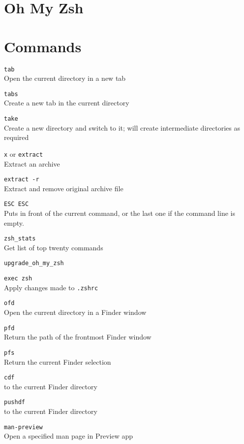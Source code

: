 \documentclass[a4paper,landscape,columns=3]{cheatsheet}
\begin{document}
\sffamily

\section{Oh My Zsh}

\bigskip

\section{Commands}

\texttt{tab}\\
Open the current directory in a new tab

\texttt{tabs}\\
Create a new tab in the current directory

\texttt{take}\\
Create a new directory and switch to it; will create intermediate directories as required

\texttt{x} or \texttt{extract}\\
Extract an archive

\texttt{extract -r}\\
Extract and remove original archive file

\texttt{ESC ESC}\\
Puts {} in front of the current command, or the last one if the command line is empty.

\texttt{zsh\_stats}\\
Get list of top twenty commands

\texttt{upgrade\_oh\_my\_zsh}

\texttt{exec zsh}\\
Apply changes made to \texttt{.zshrc}

\texttt{ofd}\\
 Open the current directory in a Finder window

\texttt{pfd}\\
 Return the path of the frontmost Finder window

\texttt{pfs}\\
 Return the current Finder selection

\texttt{cdf }\\
{} to the current Finder directory

\texttt{pushdf}\\
{} to the current Finder directory

\texttt{man-preview}\\
 Open a specified man page in Preview app
\end{document}
